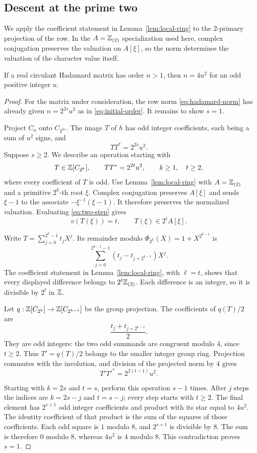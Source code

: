 \subsection{Descent at the prime two}

We apply the coefficient statement in Lemma~\ref{lem:local-ring} to
the \(2\)-primary projection of the row. In the \(A=\mathbb Z_{(2)}\)
specialization used here, complex conjugation preserves the valuation
on \(A[\xi]\), so the norm determines
the valuation of the character value itself.

\begin{proposition}\label{prop:order}
If a real circulant Hadamard matrix has order \(n>1\), then
\(n=4u^2\) for an odd positive integer \(u\).
\end{proposition}

\begin{proof}
For the matrix under consideration, the row norm
\eqref{eq:hadamard-norm} has already given
\(n=2^{2s}u^2\) as in \eqref{eq:initial-order}. It remains to show
\(s=1\).

Project \(C_n\) onto \(C_{2^{2s}}\). The image \(T\) of \(h\) has
odd integer coefficients, each being a sum of \(u^2\) signs, and
\[
 TT^*=2^{2s}u^2.
\]
Suppose \(s\geq2\). We describe an operation starting with
\begin{equation}\label{eq:two-step}
 T\in\mathbb Z[C_{2^k}],\qquad TT^*=2^{2t}u^2,
 \qquad k\geq1,\quad t\geq2,
\end{equation}
where every coefficient of \(T\) is odd. Use
Lemma~\ref{lem:local-ring} with \(A=\mathbb Z_{(2)}\) and a primitive
\(2^k\)-th root \(\xi\). Complex conjugation preserves \(A[\xi]\)
and sends \(\xi-1\) to the associate \(-\xi^{-1}(\xi-1)\).
It therefore preserves the normalized valuation. Evaluating
\eqref{eq:two-step} gives
\[
 v(T(\xi))=t,\qquad T(\xi)\in 2^tA[\xi].
\]

Write \(T=\sum_{j=0}^{2^k-1}t_jX^j\). Its remainder modulo
\(\Phi_{2^k}(X)=1+X^{2^{k-1}}\) is
\[
 \sum_{j=0}^{2^{k-1}-1}(t_j-t_{j+2^{k-1}})X^j.
\]
The coefficient statement in Lemma~\ref{lem:local-ring}, with
\(\ell=t\), shows that every displayed difference belongs to
\(2^t\mathbb Z_{(2)}\). Each difference is an integer, so it is divisible
by \(2^t\) in \(\mathbb Z\).

Let \(q:\mathbb Z[C_{2^k}]\to\mathbb Z[C_{2^{k-1}}]\) be the group projection.
The coefficients of \(q(T)/2\) are
\[
 \frac{t_j+t_{j+2^{k-1}}}{2}.
\]
They are odd integers: the two odd summands are congruent modulo
\(4\), since \(t\geq2\). Thus \(T'=q(T)/2\) belongs to the smaller
integer group ring. Projection commutes with the involution, and division
of the projected norm by \(4\) gives
\[
 T'T'^*=2^{2(t-1)}u^2.
\]

Starting with \(k=2s\) and \(t=s\), perform this operation \(s-1\)
times. After \(j\) steps the indices are \(k=2s-j\) and \(t=s-j\);
every step starts with \(t\geq2\). The final element has
\(2^{s+1}\) odd integer coefficients and product with its star equal
to \(4u^2\). The identity coefficient of that product is the sum of the squares
of those coefficients. Each odd square is \(1\) modulo \(8\), and
\(2^{s+1}\) is divisible by \(8\). The sum is therefore \(0\)
modulo \(8\), whereas \(4u^2\) is \(4\) modulo \(8\).
This contradiction proves \(s=1\).
\end{proof}
